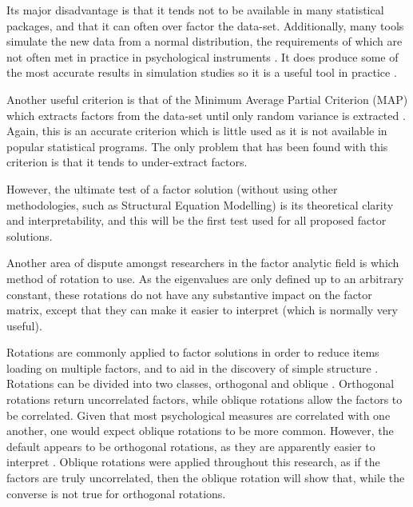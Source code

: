 Its major disadvantage is that it tends not to be available in many statistical packages, and that it can often over factor the data-set. Additionally, many tools simulate the new data from a normal distribution, the requirements of which are not often met in practice in psychological instruments \cite{micceri1989unicorn}.  It does produce some of the most accurate results in simulation studies so it is a useful tool in practice \cite{zwick1986comparison}. 

Another useful criterion is that of the Minimum Average Partial Criterion (MAP) which extracts factors from the data-set until only random variance is extracted \cite{revelle1979very}. Again, this is an accurate criterion  \cite{zwick1986comparison} which is little used as it is not available in popular statistical programs. The only problem that  has been found with this criterion is that it tends to under-extract factors. %

However, the ultimate test of a factor solution (without using other methodologies, such as Structural Equation Modelling) \cite{joreskog1978structural} is its theoretical clarity and interpretability, and this will be the first test used for all proposed factor solutions.

Another area of dispute amongst researchers in the factor analytic field is which method of rotation to use\cite{sass2010comparative}. As the eigenvalues are only defined up to an arbitrary constant, these rotations do not have any substantive impact on the factor matrix, except that they can make it easier to interpret (which is normally very useful). 

Rotations are commonly applied to factor solutions in order to reduce items loading on multiple factors, and to aid in the discovery of simple structure \cite{henson2006use}. Rotations can be divided into two classes, orthogonal and oblique \cite{sass2010comparative}. Orthogonal rotations return uncorrelated factors, while oblique rotations allow the factors to be correlated. Given that most psychological measures are correlated with one another, one would expect oblique rotations to be more common. However, the default appears to be orthogonal rotations, as they are apparently easier to interpret \cite{henson2006use}. Oblique rotations were applied throughout this research, as if the factors are truly uncorrelated, then the oblique rotation will show that, while the converse is not true for orthogonal rotations.


